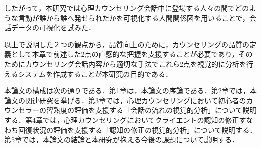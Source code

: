 \documentclass[shuuron]{kuee}
\begin{document}


したがって，本研究では心理カウンセリング会話中に登場する人々の間でどのような言動が誰から誰へ発せられたかを可視化する人間関係図を用いることで，会話データの可視化を試みた．

以上で説明した２つの観点から，品質向上のために，カウンセリングの品質の定義として本章で前述した2点の直感的な把握を支援することが必要であり，そのためにカウンセリング会話内容から適切な手法でこれら2点を視覚的に分析を行えるシステムを作成することが本研究の目的である．

本論文の構成は次の通りである．第1章は，本論文の序論である．第2章では，本論文の関連研究を挙げる．第3章では，心理カウンセリングにおいて初心者のカウンセラーの習熟度の評価を支援する「会話の流れの視覚的分析」について説明する．第4章では，心理カウンセリングにおいてクライエントの認知の修正すなわち回復状況の評価を支援する「認知の修正の視覚的分析」について説明する．第5章では，本論文の結論と本研究が抱える今後の課題について説明する．

%
\end{document}
